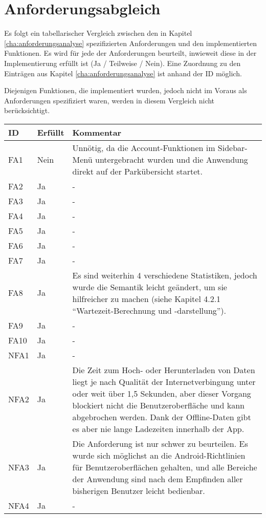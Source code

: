 \newcommand{\td}[3]{
	#1 & #2 & #3 \\ \hline
}

\chapter{Anforderungsabgleich}
\label{cha:anforderungsabgleich}

Es folgt ein tabellarischer Vergleich zwischen den in Kapitel \ref{cha:anforderungsanalyse} 
spezifizierten Anforderungen und den implementierten Funktionen. Es wird für jede der Anforderungen 
beurteilt, inwieweit diese in der Implementierung erfüllt ist (Ja / Teilweise / Nein). Eine 
Zuordnung zu den Einträgen aus Kapitel \ref{cha:anforderungsanalyse} ist anhand der ID möglich.

Diejenigen Funktionen, die implementiert wurden, jedoch nicht im Voraus als Anforderungen 
spezifiziert waren, werden in diesem Vergleich nicht berücksichtigt.

\clearpage

\label{sec:anforderungsabgleich:funktional}
\label{sec:anforderungsabgleich:nichtfunktional}

\setlength{\tabcolsep}{10pt}
\renewcommand{\arraystretch}{1.3}

\begin{center}
	\begin{table}[h]
		\begin{tabular}{ | l | l | p{11.5cm} |}
			\hline
			\textbf{ID} & \textbf{Erfüllt} & \textbf{Kommentar} \\ \hline
			\td{FA1}{Nein}{Unnötig, da die Account-Funktionen im Sidebar-Menü untergebracht wurden 
			und die Anwendung direkt auf der Parkübersicht startet.}
			\td{FA2}{Ja}{-}
			\td{FA3}{Ja}{-}
			\td{FA4}{Ja}{-}
			\td{FA5}{Ja}{-}
			\td{FA6}{Ja}{-}
			\td{FA7}{Ja}{-}
			\td{FA8}{Ja}{Es sind weiterhin 4 verschiedene Statistiken, jedoch wurde die Semantik 
			leicht geändert, um sie hilfreicher zu machen (siehe Kapitel 4.2.1 
			``Wartezeit-Berechnung und -darstellung'').}
			\td{FA9}{Ja}{-}
			\td{FA10}{Ja}{-}
			\td{NFA1}{Ja}{-}
			\td{NFA2}{Ja}{Die Zeit zum Hoch- oder Herunterladen von Daten liegt je nach Qualität der 
			Internetverbingung unter oder weit über 1,5 Sekunden, aber dieser Vorgang blockiert nicht 
			die Benutzeroberfläche und kann abgebrochen werden. Dank der Offline-Daten gibt es aber 
			nie lange Ladezeiten innerhalb der App.}
			\td{NFA3}{Ja}{Die Anforderung ist nur schwer zu beurteilen. Es wurde sich möglichst an die 
			Android-Richtlinien für Benutzeroberflächen gehalten, und alle Bereiche der 
			Anwendung sind nach dem Empfinden aller bisherigen Benutzer leicht bedienbar.}
			\td{NFA4}{Ja}{-}
		\end{tabular}
	\end{table}
\end{center}

\setlength{\tabcolsep}{6pt}
\renewcommand{\arraystretch}{1}


